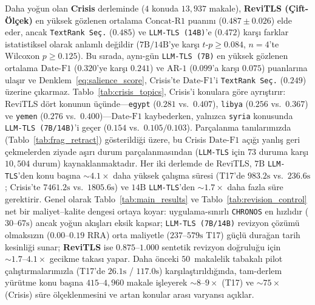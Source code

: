 ﻿\documentclass[journal]{IEEEtran}
\begin{document}
Daha yo\u{g}un olan \textbf{Crisis} derleminde ($4$ konuda $13{,}937$ makale), \textbf{ReviTLS (\c{C}ift-\"{O}l\c{c}ek)} en y\"{u}ksek g\"{o}zlenen ortalama $\text{Concat-R1}$ puan{\i}n{\i} ($0.487 \pm 0.026$) elde eder, ancak \texttt{TextRank Se\c{c}.} ($0.485$) ve \texttt{LLM-TLS (14B)}'e ($0.472$) kar\c{s}{\i} farklar istatistiksel olarak anlaml{\i} de\u{g}ildir ($7\text{B}/14\text{B}$'ye kar\c{s}{\i} $t\text{-}p \ge 0.084$, $n=4$'te Wilcoxon $p \ge 0.125$). Bu s{\i}rada, ayn{\i}-g\"{u}n \texttt{LLM-TLS (7B)} en y\"{u}ksek g\"{o}zlenen ortalama $\text{Date-F1}$ ($0.320$'ye kar\c{s}{\i} $0.241$) ve $\text{AR-1}$ ($0.099$'a kar\c{s}{\i} $0.075$) puanlar{\i}na ula\c{s}{\i}r ve Denklem~\eqref{eq:salience_score}, Crisis'te $\text{Date-F1}$'i \texttt{TextRank Se\c{c}.} ($0.249$) \"{u}zerine \c{c}{\i}karmaz. Tablo~\ref{tab:crisis_topics}, Crisis'i konulara g\"{o}re ayr{\i}\c{s}t{\i}r{\i}r: ReviTLS d\"{o}rt konunun \"{u}\c{c}\"{u}nde---\texttt{egypt} ($0.281$ vs.\ $0.407$), \texttt{libya} ($0.256$ vs.\ $0.367$) ve \texttt{yemen} ($0.276$ vs.\ $0.400$)---$\text{Date-F1}$ kaybederken, yaln{\i}zca \texttt{syria} konusunda \texttt{LLM-TLS (7B/14B)}'i ge\c{c}er ($0.154$ vs.\ $0.105/0.103$). Par\c{c}alanma tan{\i}lar{\i}m{\i}zda (Tablo~\ref{tab:frag_retract}) g\"{o}sterildi\u{g}i \"{u}zere, bu Crisis $\text{Date-F1}$ a\c{c}{\i}\u{g}{\i} yanl{\i}\c{s} geri \c{c}ekmelerden ziyade a\c{s}{\i}r{\i} durum par\c{c}alanmas{\i}ndan (\texttt{LLM-TLS} i\c{c}in $73$ duruma kar\c{s}{\i} $10{,}504$ durum) kaynaklanmaktad{\i}r. Her iki derlemde de ReviTLS, $7\text{B}$ \texttt{LLM-TLS}'den konu ba\c{s}{\i}na $\sim 4.1\times$ daha y\"{u}ksek \c{c}al{\i}\c{s}ma s\"{u}resi (T17'de $983.2\text{s}$ vs.\ $236.6\text{s}$; Crisis'te $7461.2\text{s}$ vs.\ $1805.6\text{s}$) ve $14\text{B}$ \texttt{LLM-TLS}'den $\sim 1.7\times$ daha fazla s\"{u}re gerektirir. Genel olarak Tablo~\ref{tab:main_results} ve Tablo~\ref{tab:revision_control} net bir maliyet--kalite dengesi ortaya koyar: uygulama-s{\i}n{\i}rl{\i} \texttt{CHRONOS} en h{\i}zl{\i}d{\i}r ($30\text{--}67\text{s}$) ancak yo\u{g}un ak{\i}\c{s}lar{\i} eksik kapsar; \texttt{LLM-TLS (7B/14B)} revizyon \c{c}\"{o}z\"{u}m\"{u} olmaks{\i}z{\i}n ($0.00\text{--}0.19$ RRA) orta maliyetle ($237\text{--}579\text{s}$ T17) g\"{u}\c{c}l\"{u} dura\u{g}an tarih kesinli\u{g}i sunar; \textbf{ReviTLS} ise $0.875\text{--}1.000$ sentetik revizyon do\u{g}rulu\u{g}u i\c{c}in $\sim 1.7\text{--}4.1\times$ gecikme takas{\i} yapar. Daha \"{o}nceki $50$~makalelik tabakal{\i} pilot \c{c}al{\i}\c{s}t{\i}rmalar{\i}m{\i}zla (T17'de $26.1\text{s}$ / $117.0\text{s}$) kar\c{s}{\i}la\c{s}t{\i}r{\i}ld{\i}\u{g}{\i}nda, tam-derlem y\"{u}r\"{u}tme konu ba\c{s}{\i}na $415\text{--}4{,}960$ makale i\c{s}leyerek $\sim 8\text{--}9\times$ (T17) ve $\sim 75\times$ (Crisis) s\"{u}re \"{o}l\c{c}eklenmesini ve artan konular aras{\i} varyans{\i} a\c{c}{\i}klar.
\end{document}
